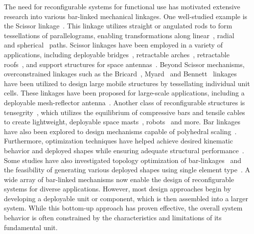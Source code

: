The need for reconfigurable systems for functional use has motivated extensive research into various bar-linked mechanical linkages. One well-studied example is the Scissor linkage~\citep{you1997scissor}. This linkage utilizes straight or angulated rods to form tessellations of parallelograms, enabling transformations along linear~\citep{kim2021scissor}, radial~\citep{patel2007scissor} and spherical~\citep{hoberman1991scissor} paths. Scissor linkages have been employed in a variety of applications, including deployable bridges~\citep{ario2013bridge}, retractable arches~\citep{brouwer2002arch, mira2014arch}, retractable roofs~\citep{kassabian1999roof}, and support structures for space antennas~\citep{han2019antenna}. Beyond Scissor mechanisms, overconstrained linkages such as the Bricard~\citep{baker1980bricard}, Myard~\citep{liu2009myard} and Bennett~\citep{chen2005bennett} linkages have been utilized to design large mobile structures by tessellating individual unit cells. These linkages have been proposed for large-scale applications, including a deployable mesh-reflector antenna~\cite{qi2017bricard}. Another class of reconfigurable structures is tensegrity~\citep{snelson1965tensegrity}, which utilizes the equilibrium of compressive bars and tensile cables to create lightweight, deployable space masts~\citep{tibert2002tensegrity}, robots~\citep{liu2022tensegrity} and more. Bar linkages have also been explored to design mechanisms capable of polyhedral scaling~\citep{kiper2008polyhedra}. Furthermore, optimization techniques have helped achieve desired kinematic behavior and deployed shapes while ensuring adequate structural performance~\citep{li2023opt}. Some studies have also investigated topology optimization of bar-linkages~\citep{kim2014opt} and the feasibility of generating various deployed shapes using single element type~\citep{garcia2021limitations}. A wide array of bar-linked mechanisms now enable the design of reconfigurable systems for diverse applications. However, most design approaches begin by developing a deployable unit or component, which is then assembled into a larger system. While this bottom-up approach has proven effective, the overall system behavior is often constrained by the characteristics and limitations of its fundamental unit. 

